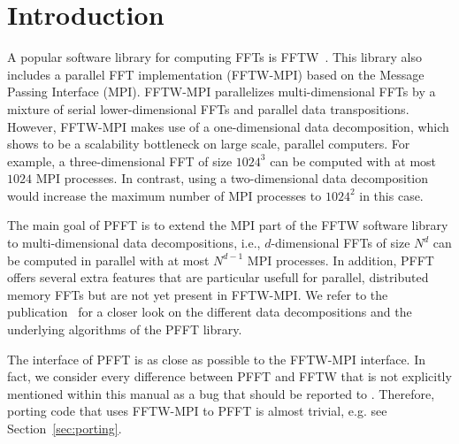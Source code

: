 
\chapter{Introduction}\label{chap:intro}
A popular software library for computing FFTs is FFTW~\cite{fftw, FFTW05}. This library also includes a parallel FFT implementation (FFTW-MPI) based on the Message Passing Interface (MPI).
FFTW-MPI parallelizes multi-dimensional FFTs by a mixture of serial lower-dimensional FFTs and parallel data transpositions.
However, FFTW-MPI makes use of a one-dimensional data decomposition, which shows to be a scalability bottleneck on large scale, parallel computers.
For example, a three-dimensional FFT of size $1024^3$ can be computed with at most $1024$ MPI processes.
In contrast, using a two-dimensional data decomposition would increase the maximum number of MPI processes to $1024^2$ in this case.

The main goal of PFFT is to extend the MPI part of the FFTW software library to multi-dimensional data decompositions,
i.e., $d$-dimensional FFTs of size $N^d$ can be computed in parallel with at most $N^{d-1}$ MPI processes.
In addition, PFFT offers several extra features that are particular usefull for parallel, distributed memory FFTs but are not yet present in FFTW-MPI.
We refer to the publication~\cite{Pi13} for a closer look on the different data decompositions and the underlying algorithms of the PFFT library.

The interface of PFFT is as close as possible to the FFTW-MPI interface. 
In fact, we consider every difference between PFFT and FFTW that is not explicitly mentioned within this manual as a bug that should be reported to \webpfft.
Therefore, porting code that uses FFTW-MPI to PFFT is almost trivial, e.g. see Section~\ref{sec:porting}.

